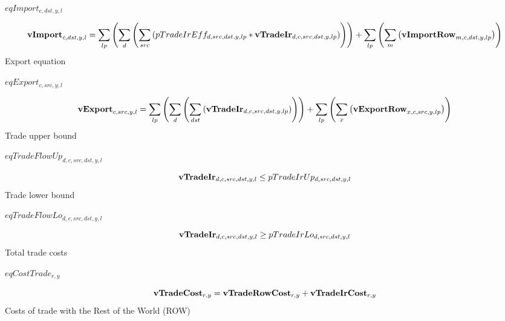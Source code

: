 \documentclass{article}
\begin{document}
$eqImport_{c,dst,y,l}$





\begin{dmath} 
{\bf vImport}_{c,dst,y,l}  =  \sum_{lp}{\left(\sum_{d}{\left(\sum_{src}{\left(pTradeIrEff_{d,src,dst,y,lp}*{\bf vTradeIr}_{d,c,src,dst,y,lp}\right)}\right)}\right)}+\sum_{lp}{\left(\sum_{m}{\left({\bf vImportRow}_{m,c,dst,y,lp}\right)}\right)}
\end{dmath} 
Export equation







$eqExport_{c,src,y,l}$





\begin{dmath} 
{\bf vExport}_{c,src,y,l}  =  \sum_{lp}{\left(\sum_{d}{\left(\sum_{dst}{\left({\bf vTradeIr}_{d,c,src,dst,y,lp}\right)}\right)}\right)}+\sum_{lp}{\left(\sum_{x}{\left({\bf vExportRow}_{x,c,src,y,lp}\right)}\right)}
\end{dmath} 
Trade upper bound







$eqTradeFlowUp_{d,c,src,dst,y,l}$





\begin{dmath} 
{\bf vTradeIr}_{d,c,src,dst,y,l}  \le  pTradeIrUp_{d,src,dst,y,l}
\end{dmath} 
Trade lower bound







$eqTradeFlowLo_{d,c,src,dst,y,l}$





\begin{dmath} 
{\bf vTradeIr}_{d,c,src,dst,y,l}  \ge  pTradeIrLo_{d,src,dst,y,l}
\end{dmath} 
Total trade costs







$eqCostTrade_{r,y}$





\begin{dmath} 
{\bf vTradeCost}_{r,y}  =  {\bf vTradeRowCost}_{r,y}+{\bf vTradeIrCost}_{r,y}
\end{dmath} 
Costs of trade with the Rest of the World (ROW)
\end{document}
